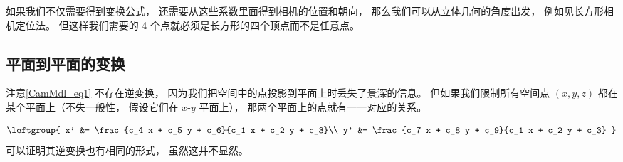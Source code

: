 如果我们不仅需要得到变换公式， 还需要从这些系数里面得到相机的位置和朝向， 那么我们可以从立体几何的角度出发， 例如见长方形相机定位法。 但这样我们需要的 4 个点就必须是长方形的四个顶点而不是任意点。

\subsection{平面到平面的变换}
注意\autoref{CamMdl_eq1} 不存在逆变换， 因为我们把空间中的点投影到平面上时丢失了景深的信息。 但如果我们限制所有空间点 $(x, y, z)$ 都在某个平面上（不失一般性， 假设它们在 $x$-$y$ 平面上）， 那两个平面上的点就有一一对应的关系。

\begin{equation}
\leftgroup{
x' &= \frac{c_4 x + c_5 y + c_6}{c_1 x + c_2 y + c_3}\\
y' &= \frac{c_7 x + c_8 y + c_9}{c_1 x + c_2 y + c_3}
}
\end{equation}
可以证明其逆变换也有相同的形式， 虽然这并不显然。
